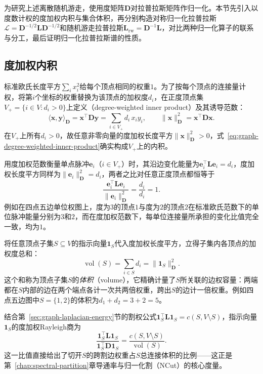 为研究上述离散随机游走，使用度矩阵$\bm D$对拉普拉斯矩阵作归一化。本节先引入以度数计权的度加权内积与集合体积，再分别构造对称归一化拉普拉斯$\mathcal L=\bm D^{-1/2}\bm L\bm D^{-1/2}$和随机游走拉普拉斯$\bm L_{\mathrm{rw}}=\bm D^{-1}\bm L$，对比两种归一化算子的联系与分工，最后证明归一化拉普拉斯谱的性质。

\subsection{度加权内积}
\label{sec:graph-degree-weighted-inner-product}

标准欧氏长度平方$\sum_i x_i^2$给每个顶点相同的权重$1$。为了按每个顶点的连接量计权，将第$i$个坐标的权重替换为该顶点的加权度$d_i$，在正度顶点集$V_+=\{i\in V:d_i>0\}$上定义（degree-weighted inner product）及其诱导范数：
\begin{equation}
  \langle \bm x,\bm y\rangle_{\bm D}
  =\bm x^\top\bm D\bm y
  =\sum_{i\in V_+}d_i\,x_iy_i,
  \qquad
  \lVert\bm x\rVert_{\bm D}^2=\bm x^\top\bm D\bm x.
  \label{eq:graph-degree-weighted-inner-product}
\end{equation}
在$V_+$上所有$d_i>0$，故任意非零向量的度加权长度平方$\lVert\bm x\rVert_{\bm D}^2>0$，式~\eqref{eq:graph-degree-weighted-inner-product}确实构成$V_+$上的内积。

用度加权范数衡量单点脉冲$\bm e_i$（$i\in V_+$）时，其沿边变化能量为$\bm e_i^\top\bm L\bm e_i=d_i$，度加权长度平方同样为$\lVert\bm e_i\rVert_{\bm D}^2=d_i$，两者之比对任意正度顶点都恒等于
\[
  \frac{\bm e_i^\top\bm L\bm e_i}{\lVert\bm e_i\rVert_{\bm D}^2}=\frac{d_i}{d_i}=1.
\]
例如在四点五边单位权图上，度为$3$的顶点$1$与度为$2$的顶点$2$在标准欧氏范数下的单位脉冲能量分别为$3$和$2$，而在度加权范数下，每单位连接量所承担的变化比值完全一致，均为$1$。

将任意顶点子集$S\subseteq V$的指示向量$\bm 1_S$代入度加权长度平方，立得子集内各顶点的加权度总和：
\begin{equation}
  \operatorname{vol}(S)=\sum_{i\in S}d_i
  =\lVert\bm1_S\rVert_{\bm D}^2.
  \label{eq:graph-laplacian-vertex-volume}
\end{equation}
这个和称为顶点子集$S$的\emph{体积}（volume），它精确计量了$S$所关联的边权容量：两端都在$S$内部的边在两个端点各计一次共两倍权重，跨出$S$的边计一倍权重。例如四点五边图中$S=\{1,2\}$的体积为$d_1+d_2=3+2=5$。

结合第~\ref{sec:graph-laplacian-energy}节的割权公式$\bm 1_S^\top\bm L\bm 1_S=c(S,V\setminus S)$，指示向量$\bm 1_S$的度加权Rayleigh商为
\[
  \frac{\bm 1_S^\top\bm L\bm 1_S}{\bm 1_S^\top\bm D\bm 1_S}
  =\frac{c(S,V\setminus S)}{\operatorname{vol}(S)}.
\]
这一比值直接给出了切开$S$的跨割边权重占$S$总连接体积的比例——这正是第~\ref{chap:spectral-partition}章导通率与归一化割（NCut）的核心度量。

